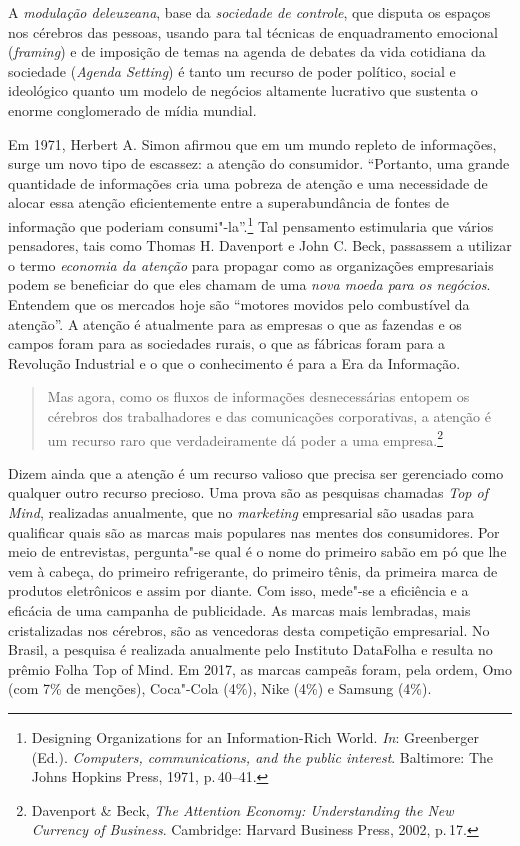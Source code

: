 A \textit{modulação deleuzeana}, base da \textit{sociedade de controle}, que
disputa os espaços nos cérebros das pessoas, usando para tal técnicas de
enquadramento emocional (\textit{framing}) e de imposição de temas na
agenda de debates da vida cotidiana da sociedade (\textit{Agenda Setting})
é tanto um recurso de poder político, social e ideológico quanto um
modelo de negócios altamente lucrativo que sustenta o enorme
conglomerado de mídia mundial.

Em 1971, Herbert A. Simon afirmou que em um mundo repleto de
informações, surge um novo tipo de escassez: a atenção do consumidor.
``Portanto, uma grande quantidade de informações cria uma pobreza de
atenção e uma necessidade de alocar essa atenção eficientemente entre a
superabundância de fontes de informação que poderiam consumi"-la''.\footnote{Designing Organizations for an Information-Rich World. \textit{In}: Greenberger (Ed.). \textit{Computers, communications, and the public interest}. Baltimore: The Johns Hopkins Press, 1971, p.\,40--41.} Tal pensamento estimularia que vários pensadores,
tais como Thomas H. Davenport e John C. Beck, passassem a utilizar o
termo \textit{economia da atenção} para propagar como as organizações
empresariais podem se beneficiar do que eles chamam de uma \textit{nova moeda
para os negócios}. Entendem que os mercados hoje são ``motores movidos
pelo combustível da atenção''. A atenção é atualmente para as empresas o
que as fazendas e os campos foram para as sociedades rurais, o que as
fábricas foram para a Revolução Industrial e o que o conhecimento é para
a Era da Informação.

\begin{quote}
Mas agora, como os fluxos de informações desnecessárias entopem os
cérebros dos trabalhadores e das comunicações corporativas, a atenção é
um recurso raro que verdadeiramente dá poder a uma empresa.\footnote{Davenport \& Beck, \textit{The Attention Economy: Understanding the New Currency of Business}. Cambridge: Harvard Business Press, 2002, p.\,17.}
\end{quote}

Dizem ainda que a atenção é um recurso valioso que precisa ser
gerenciado como qualquer outro recurso precioso. Uma prova são as
pesquisas chamadas \textit{Top of Mind}, realizadas anualmente, que no
\textit{marketing} empresarial são usadas para qualificar quais são as
marcas mais populares nas mentes dos consumidores. Por meio de
entrevistas, pergunta"-se qual é o nome do primeiro sabão em pó que lhe
vem à cabeça, do primeiro refrigerante, do primeiro tênis, da primeira
marca de produtos eletrônicos e assim por diante. Com isso, mede"-se a
eficiência e a eficácia de uma campanha de publicidade. As marcas mais
lembradas, mais cristalizadas nos cérebros, são as vencedoras desta
competição empresarial. No Brasil, a pesquisa é realizada anualmente
pelo Instituto DataFolha e resulta no prêmio Folha Top of Mind. Em 2017,
as marcas campeãs foram, pela ordem, Omo (com 7\% de menções), Coca"-Cola
(4\%), Nike (4\%) e Samsung (4\%).

